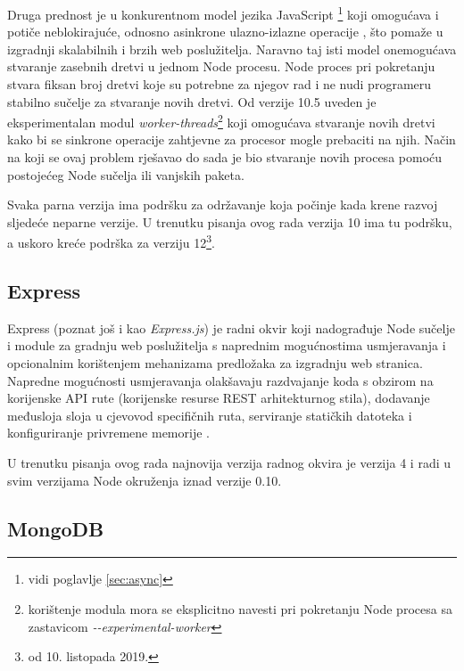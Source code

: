 \documentclass[times, utf8, diplomski, numeric]{fer}
\newcommand{\razmaks}{\vspace{10pt}}
\begin{document}
Druga prednost je u konkurentnom model jezika JavaScript \footnote{vidi poglavlje \ref{sec:async}} koji omogućava i potiče neblokirajuće, odnosno asinkrone ulazno-izlazne operacije , što pomaže u izgradnji skalabilnih i brzih web poslužitelja.
Naravno taj isti model onemogućava stvaranje zasebnih dretvi u jednom Node procesu. Node proces pri pokretanju stvara fiksan broj dretvi koje su potrebne za njegov rad i ne nudi programeru stabilno sučelje za stvaranje novih dretvi.
Od verzije 10.5 uveden je eksperimentalan modul \emph{worker-threads}\footnote{
    korištenje modula mora se eksplicitno navesti pri pokretanju Node procesa sa zastavicom \emph{-{}-experimental-worker}
} koji omogućava stvaranje novih dretvi kako bi se sinkrone operacije zahtjevne za procesor  mogle prebaciti na njih.
Način na koji se ovaj problem rješavao do sada je bio stvaranje novih procesa pomoću postojećeg Node sučelja ili vanjskih paketa\citep{art_node}.

Svaka parna verzija ima podršku za održavanje  koja počinje kada krene razvoj sljedeće neparne verzije.
U trenutku pisanja ovog rada verzija 10 ima tu podršku, a uskoro kreće podrška za verziju 12\footnote{od 10. listopada 2019.}\citep{wiki_node}.


\newpage
\subsection{Express}

Express (poznat još i kao \emph{Express.js}) je radni okvir  koji nadograđuje Node sučelje i module za gradnju web poslužitelja s naprednim mogućnostima usmjeravanja  i opcionalnim korištenjem mehanizama predložaka  za izgradnju web stranica.
Napredne mogućnosti usmjeravanja olakšavaju razdvajanje koda s obzirom na korijenske API rute (korijenske resurse REST arhitekturnog stila), dodavanje međusloja sloja  u cjevovod  specifičnih ruta, serviranje statičkih datoteka i konfiguriranje privremene memorije .

U trenutku pisanja ovog rada najnovija verzija radnog okvira je verzija 4 i radi u svim verzijama Node okruženja iznad verzije 0.10\citep{gh_express}.


\razmaks
\subsection{MongoDB} \label{sec:mongo}
\end{document}
